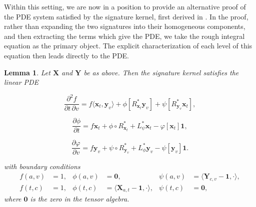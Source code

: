 \documentclass{article}%
\newtheorem{lemma}[theorem]{Lemma}
\begin{document}
Within this setting, we are now in a position to provide an alternative proof of the PDE system satisfied by the signature kernel, first derived in \cite{lemercier2024log}.
In the proof, rather than expanding the two signatures into their homogeneous components, and then extracting the terms which give the PDE, we take the rough integral equation as the primary object. The explicit characterization of each level of this equation then leads directly to the PDE.


\begin{lemma}
Let $\mathbf{X}$ and $\mathbf{Y}$ be as above. Then the signature kernel satisfies the linear PDE

\begin{equation*}
\frac{\partial^2 f}{\partial t \, \partial v}
= f \langle \boldsymbol{x}_t, \boldsymbol{y}_v \rangle
+  \phi[R^*_{\boldsymbol{x}_t}  \boldsymbol{y}_v] 
+  \psi[R^*_{\boldsymbol{y}_v} \boldsymbol{x}_t],
\end{equation*}

\begin{equation*}
\frac{\partial \phi}{\partial t}
= f \boldsymbol{x}_t
+ \phi \circ R^*_{\boldsymbol{x}_t}
+ L^*_{\psi}\boldsymbol{x}_t
- \varphi[\boldsymbol{x}_t] \mathbf{1} ,
\end{equation*}

\begin{equation*}
\frac{\partial \varphi}{\partial v}
= f \boldsymbol{y}_v
+ \psi \circ R^*_{\boldsymbol{y}_v}
+ L^*_{\phi}\boldsymbol{y}_v
- \psi[\boldsymbol{y}_v] \mathbf{1} .
\end{equation*}

\medskip

\noindent
with boundary conditions
\[
\begin{aligned}
f(a,v) &= 1, 
& \phi(a,v) &= \mathbf{0}, 
& \psi(a,v) &= \langle \mathbf{Y}_{c,v} - \mathbf{1}, \cdot \rangle, \\
f(t,c) &= 1, 
& \phi(t,c) &= \langle \mathbf{X}_{a,t} - \mathbf{1}, \cdot\rangle,
& \psi(t,c) &= \mathbf{0},
\end{aligned}
\]
where $\mathbf{0}$ is the zero in the tensor algebra.
\end{lemma}
\end{document}
